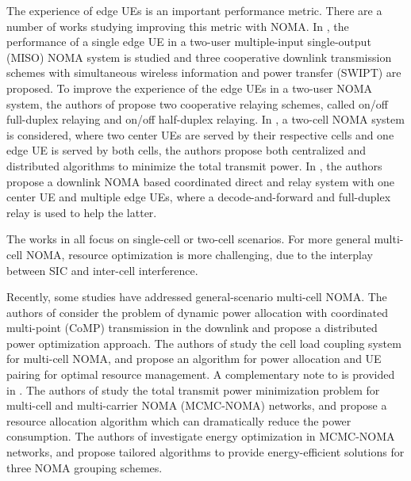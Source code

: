 \documentclass[10pt,journal,final,finalsubmission,twocolumn]{IEEEtran}
\begin{document}
The experience of edge UEs is an important performance metric. There are a number of works studying improving this metric with NOMA. In \cite{Do1}, the performance of a single edge UE in a two-user multiple-input single-output (MISO) NOMA system is studied and three cooperative downlink transmission schemes with simultaneous wireless information and power transfer (SWIPT) are proposed. To improve the experience of the edge UEs in a two-user NOMA system, the authors of \cite{Do2} propose two cooperative relaying schemes, called on/off full-duplex relaying and on/off half-duplex relaying. In \cite{Guo}, a two-cell NOMA system is considered, where two center UEs are served by their respective cells and one edge UE is served by both cells, the authors propose both centralized and distributed algorithms to minimize the total transmit power. In \cite{Pei}, the authors propose a downlink NOMA based coordinated direct and relay system with one center UE and multiple edge UEs, where a decode-and-forward and full-duplex relay is used to help the latter.

The works in \cite{Do1, Do2, Guo, Pei} all focus on single-cell or two-cell scenarios. For more general multi-cell NOMA, resource optimization is more challenging, due to the interplay between SIC and inter-cell interference.

Recently, some studies have addressed general-scenario multi-cell NOMA. The authors of \cite{Ali} consider the problem of dynamic power allocation with coordinated multi-point (CoMP) transmission in the downlink and propose a distributed power optimization approach. The authors of \cite{You1} study the cell load coupling system for multi-cell NOMA, and propose an algorithm for power allocation and UE pairing for optimal resource management. A complementary note to \cite{You1} is provided in \cite{You2}. The authors of \cite{Ni} study the total transmit power minimization problem for multi-cell and multi-carrier NOMA (MCMC-NOMA) networks, and propose a resource allocation algorithm which can dramatically reduce the power consumption. The authors of \cite{Lei} investigate energy optimization in MCMC-NOMA networks, and propose tailored algorithms to provide energy-efficient solutions for three NOMA grouping schemes.
\end{document}
